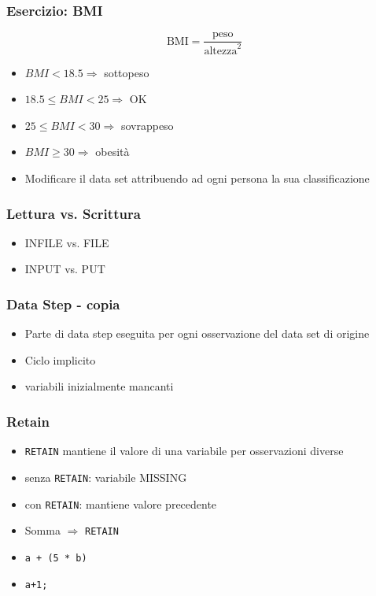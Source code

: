 \begin{frame}\frametitle{Esercizio: BMI}
  $$\text{BMI} = \frac{\text{peso}}{\text{altezza}^2}$$
  \begin{itemize}
  \item
    $BMI < 18.5 \Rightarrow$ sottopeso
  \item
    $18.5 \le BMI < 25 \Rightarrow$ OK
  \item
    $25 \le BMI < 30 \Rightarrow$ sovrappeso
  \item
    $BMI \ge 30 \Rightarrow$ obesit{\`a}
  \item
    Modificare il data set attribuendo ad ogni persona la sua classificazione
  \end{itemize}\end{frame}






\begin{frame}\frametitle{Lettura vs. Scrittura}
\begin{itemize}
\item
INFILE vs. FILE
\item
INPUT vs. PUT
\end{itemize}
\end{frame}



\begin{frame}[fragile]\frametitle{Data Step - copia }
  \begin{itemize}
  \item
    Parte di data step eseguita per ogni osservazione del data set di origine
  \item
    Ciclo implicito
  \item variabili inizialmente mancanti
  \end{itemize}
\end{frame}

\begin{frame}[fragile]\frametitle{Retain}
  \begin{itemize}
  \item
    \verb+RETAIN+ mantiene il valore di una variabile per osservazioni diverse
  \item
    senza \verb+RETAIN+: variabile MISSING
  \item
    con \verb+RETAIN+: mantiene valore precedente
  \item
    Somma $\Rightarrow$ \verb+RETAIN+
  \item
    \verb!a + (5 * b)!
  \item
    \verb!a+1;!
  \end{itemize}
\end{frame}




